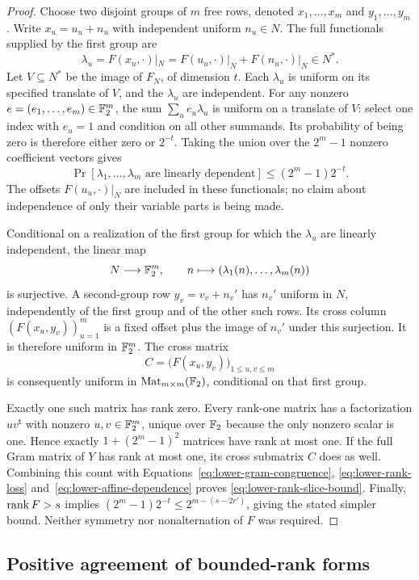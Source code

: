 \begin{proof}
Choose two disjoint groups of $m$ free rows, denoted
$x_1,\ldots,x_m$ and $y_1,\ldots,y_m$.  Write
$x_u=u_u+n_u$ with independent uniform $n_u\in N$.  The full
functionals supplied by the first group are
\[
 \lambda_u=F(x_u,\cdot)|_N
     =F(u_u,\cdot)|_N+F(n_u,\cdot)|_N\in N^*.
\]
Let $V\subseteq N^*$ be the image of $F_N$, of dimension $t$.
Each $\lambda_u$ is uniform on its specified translate of $V$, and the
$\lambda_u$ are independent.  For any nonzero
$e=(e_1,\ldots,e_m)\in\mathbb F_2^m$, the sum
$\sum_u e_u\lambda_u$ is uniform on a translate of $V$: select one
index with $e_u=1$ and condition on all other summands.  Its probability
of being zero is therefore either zero or $2^{-t}$.  Taking the union
over the $2^m-1$ nonzero coefficient vectors gives
\begin{equation}\label{eq:lower-affine-dependence}
 \Pr[\lambda_1,\ldots,\lambda_m\text{ are linearly dependent}]
       \leq(2^m-1)2^{-t}.
\end{equation}
The offsets $F(u_u,\cdot)|_N$ are included in these functionals; no
claim about independence of only their variable parts is being made.

Conditional on a realization of the first group for which the
$\lambda_u$ are linearly independent, the linear map
\[
 N\longrightarrow\mathbb F_2^m,\qquad
 n\longmapsto(\lambda_1(n),\ldots,\lambda_m(n))
\]
is surjective.  A second-group row $y_v=v_v+n_v'$ has $n_v'$ uniform
in $N$, independently of the first group and of the other such rows.
Its cross column $(F(x_u,y_v))_{u=1}^m$ is a fixed offset plus the image
of $n_v'$ under this surjection.  It is therefore uniform in $\mathbb F_2^m$.
The cross matrix
\[
 C=\bigl(F(x_u,y_v)\bigr)_{1\leq u,v\leq m}
\]
is consequently uniform in $\operatorname{Mat}_{m\times m}(\mathbb F_2)$, conditional on that
first group.

Exactly one such matrix has rank zero.  Every rank-one matrix has a
factorization $uv^{\mathsf t}$ with nonzero $u,v\in\mathbb F_2^m$, unique over
$\mathbb F_2$ because the only nonzero scalar is one.  Hence exactly
$1+(2^m-1)^2$ matrices have rank at most one.  If the full Gram matrix
of $Y$ has rank at most one, its cross submatrix $C$ does as well.
Combining this count with
Equations~\ref{eq:lower-gram-congruence},
\ref{eq:lower-rank-loss} and~\ref{eq:lower-affine-dependence} proves
\eqref{eq:lower-rank-slice-bound}.  Finally, $\operatorname{rank} F>s$ implies
$(2^m-1)2^{-t}\leq2^{m-(s-2r')}$, giving the stated simpler bound.
Neither symmetry nor nonalternation of $F$ was required.
\end{proof}

\subsection{Positive agreement of bounded-rank forms}

